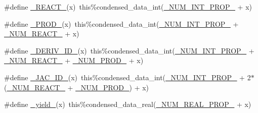 \begin{DoxyCompactItemize}
\item 
\#define \mbox{\hyperlink{rxn___c_m_a_q___h2_o2_8_f90_a2465fb6c1cce932a0bb29dac2975ee64}{\+\_\+\+R\+E\+A\+C\+T\+\_\+}}(x)~this\%condensed\+\_\+data\+\_\+int(\mbox{\hyperlink{sub__model___u_n_i_f_a_c_8_f90_a54f7194dc6a244f7eb7a78f88b3362ba}{\+\_\+\+N\+U\+M\+\_\+\+I\+N\+T\+\_\+\+P\+R\+O\+P\+\_\+}} + x)
\item 
\#define \mbox{\hyperlink{rxn___c_m_a_q___h2_o2_8_f90_ad730666d44e45e220232510d9e15ec79}{\+\_\+\+P\+R\+O\+D\+\_\+}}(x)~this\%condensed\+\_\+data\+\_\+int(\mbox{\hyperlink{sub__model___u_n_i_f_a_c_8_f90_a54f7194dc6a244f7eb7a78f88b3362ba}{\+\_\+\+N\+U\+M\+\_\+\+I\+N\+T\+\_\+\+P\+R\+O\+P\+\_\+}} + \mbox{\hyperlink{rxn__troe_8_f90_aee1fee52189b85b8a55162815b7eb2ab}{\+\_\+\+N\+U\+M\+\_\+\+R\+E\+A\+C\+T\+\_\+}} + x)
\item 
\#define \mbox{\hyperlink{rxn___c_m_a_q___h2_o2_8_f90_a8df20fa2e866ca68998160fdeef08b19}{\+\_\+\+D\+E\+R\+I\+V\+\_\+\+I\+D\+\_\+}}(x)~this\%condensed\+\_\+data\+\_\+int(\mbox{\hyperlink{sub__model___u_n_i_f_a_c_8_f90_a54f7194dc6a244f7eb7a78f88b3362ba}{\+\_\+\+N\+U\+M\+\_\+\+I\+N\+T\+\_\+\+P\+R\+O\+P\+\_\+}} + \mbox{\hyperlink{rxn__troe_8_f90_aee1fee52189b85b8a55162815b7eb2ab}{\+\_\+\+N\+U\+M\+\_\+\+R\+E\+A\+C\+T\+\_\+}} + \mbox{\hyperlink{rxn__troe_8_f90_a0ab2d7e00e334b5c52335f26ef6025e8}{\+\_\+\+N\+U\+M\+\_\+\+P\+R\+O\+D\+\_\+}} + x)
\item 
\#define \mbox{\hyperlink{rxn___c_m_a_q___h2_o2_8_f90_af0ecfa7b0240c903b78101cd3e4ac0c7}{\+\_\+\+J\+A\+C\+\_\+\+I\+D\+\_\+}}(x)~this\%condensed\+\_\+data\+\_\+int(\mbox{\hyperlink{sub__model___u_n_i_f_a_c_8_f90_a54f7194dc6a244f7eb7a78f88b3362ba}{\+\_\+\+N\+U\+M\+\_\+\+I\+N\+T\+\_\+\+P\+R\+O\+P\+\_\+}} + 2$\ast$(\mbox{\hyperlink{rxn__troe_8_f90_aee1fee52189b85b8a55162815b7eb2ab}{\+\_\+\+N\+U\+M\+\_\+\+R\+E\+A\+C\+T\+\_\+}} + \mbox{\hyperlink{rxn__troe_8_f90_a0ab2d7e00e334b5c52335f26ef6025e8}{\+\_\+\+N\+U\+M\+\_\+\+P\+R\+O\+D\+\_\+}}) + x)
\item 
\#define \mbox{\hyperlink{rxn___c_m_a_q___h2_o2_8_f90_a767b378bc7f42ea6f251cd44b8bc09da}{\+\_\+yield\+\_\+}}(x)~this\%condensed\+\_\+data\+\_\+real(\mbox{\hyperlink{sub__model___u_n_i_f_a_c_8_f90_a242fac7fe42c0d62936c65735dc023a6}{\+\_\+\+N\+U\+M\+\_\+\+R\+E\+A\+L\+\_\+\+P\+R\+O\+P\+\_\+}} + x)
\end{DoxyCompactItemize}

